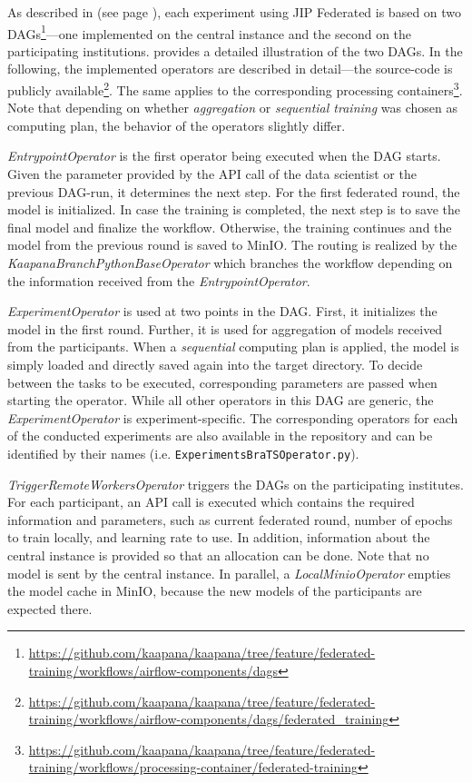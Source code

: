 As described in  (see page \pageref{subsec:MethodsJIPFederated}), each experiment using JIP Federated is based on two DAGs\footnote{\url{https://github.com/kaapana/kaapana/tree/feature/federated-training/workflows/airflow-components/dags}}---one implemented on the central instance and the second on the participating institutions.  provides a detailed illustration of the two DAGs.
In the following, the implemented operators are described in detail---the source-code is publicly available\footnote{\url{https://github.com/kaapana/kaapana/tree/feature/federated-training/workflows/airflow-components/dags/federated_training}}.
The same applies to the corresponding processing containers\footnote{\url{https://github.com/kaapana/kaapana/tree/feature/federated-training/workflows/processing-container/federated-training}}.
Note that depending on whether \textit{aggregation} or \textit{sequential training} was chosen as computing plan, the behavior of the operators slightly differ.

\textit{EntrypointOperator} is the first operator being executed when the DAG starts. Given the parameter provided by the API call of the data scientist or the previous DAG-run, it determines the next step. 
For the first federated round, the model is initialized. In case the training is completed, the next step is to save the final model and finalize the workflow.
Otherwise, the training continues and the model from the previous round is saved to MinIO.
The routing is realized by the \textit{KaapanaBranchPythonBaseOperator} which branches the workflow depending on the information received from the \textit{EntrypointOperator}.

\textit{ExperimentOperator} is used at two points in the DAG. First, it initializes the model in the first round. Further, it is used for aggregation of models received from the participants. When a \textit{sequential} computing plan is applied, the model is simply loaded and directly saved again into the target directory.
To decide between the tasks to be executed, corresponding parameters are passed when starting the operator.
While all other operators in this DAG are generic, the \textit{ExperimentOperator} is experiment-specific. The corresponding operators for each of the conducted experiments are also available in the repository and can be identified by their names (i.e. \verb|ExperimentsBraTSOperator.py|).

\textit{TriggerRemoteWorkersOperator} triggers the DAGs on the participating institutes. For each participant, an API call is executed which contains the required information and parameters, such as current federated round, number of epochs to train locally, and learning rate to use. In addition, information about the central instance is provided so that an allocation can be done. Note that no model is sent by the central instance.
In parallel, a \textit{LocalMinioOperator} empties the model cache in MinIO, because the new models of the participants are expected there.

